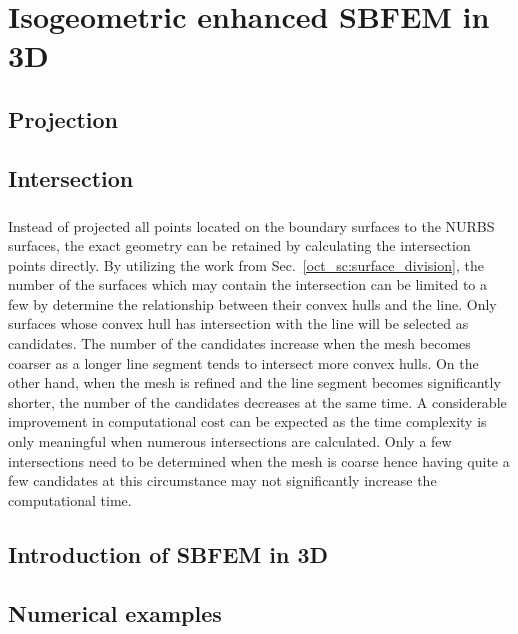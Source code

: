 
\chapter{Isogeometric enhanced SBFEM in 3D}


\section{Projection}




\section{Intersection}
\paragraph{}
Instead of projected all points located on the boundary surfaces to the NURBS surfaces, the exact geometry can be retained by calculating the intersection points directly.
By utilizing the work from Sec.~\ref{oct_sc:surface_division}, the number of the surfaces which may contain the intersection can be limited to a few by determine the relationship between their convex hulls and the line.
Only surfaces whose convex hull has intersection with the line will be selected as candidates.
The number of the candidates increase when the mesh becomes coarser as a longer line segment tends to intersect more convex hulls.
On the other hand, when the mesh is refined and the line segment becomes significantly shorter, the number of the candidates decreases at the same time.
A considerable improvement in computational cost can be expected as the time complexity is only meaningful when numerous intersections are calculated.
Only a few intersections need to be determined when the mesh is coarse hence having quite a few candidates at this circumstance may not significantly increase the computational time.




\section{Introduction of SBFEM in 3D}


\section{Numerical examples}





